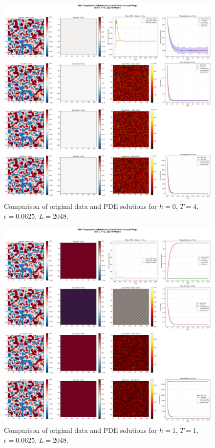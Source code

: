 \documentclass[11pt,a4paper]{article}
\begin{document}
\begin{figure}[!h]
    \centering
    \includegraphics[width=1.0\textwidth]{fig/compare_pde_solvers_L2048_h0_T4_eps0.0625.png}
    \caption{Comparison of original data and PDE solutions for $h=0$, $T=4$, $\epsilon=0.0625$, $L=2048$.}
    \label{fig:pde_comparison_h0_T4_eps0.0625_L2048}
\end{figure}

\begin{figure}[!h]
    \centering
    \includegraphics[width=1.0\textwidth]{fig/compare_pde_solvers_L2048_h1_T1_eps0.0625.png}
    \caption{Comparison of original data and PDE solutions for $h=1$, $T=1$, $\epsilon=0.0625$, $L=2048$.}
    \label{fig:pde_comparison_h1_T1_eps0.0625_L2048}
\end{figure}
\end{document}
